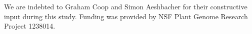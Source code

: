 \documentclass{pnastwo}
\begin{document}
\begin{article}
\begin{materials}
\end{materials}

\begin{acknowledgments}
We are indebted to Graham Coop and Simon Aeshbacher for their constructive input during this study. Funding was provided by NSF Plant Genome Research Project 1238014.
\end{acknowledgments}




\onecolumn
 


\end{article}
\end{document}

